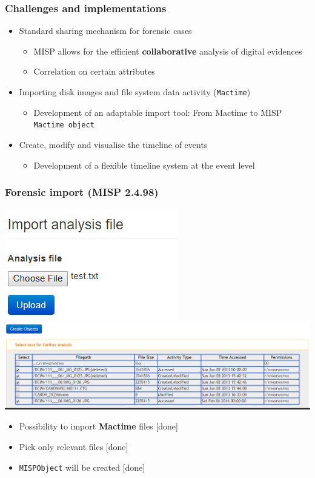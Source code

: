 \begin{frame}
\frametitle{Challenges and implementations}
    \begin{itemize}
        \item Standard sharing mechanism for forensic cases
            \begin{itemize}
                \item MISP allows for the efficient \textbf{collaborative} analysis of digital evidences
                \item Correlation on certain attributes
            \end{itemize}
        \item Importing disk images and file system data activity (\texttt{Mactime})
            \begin{itemize}
                \item Development of an adaptable import tool: From Mactime to MISP \texttt{Mactime object}
            \end{itemize}
        \item Create, modify and visualise the timeline of events
            \begin{itemize}
                \item Development of a flexible timeline system at the event level
            \end{itemize}
    \end{itemize}
\end{frame}

\begin{frame}
        \frametitle{Forensic import (MISP 2.4.98)}
    \centering
    \includegraphics[scale=0.3]{pics/import.png}
    \includegraphics[scale=0.3]{pics/import-table.png}
    \begin{itemize}
        \item Possibility to import \textbf{Mactime} files [done]
        \item Pick only relevant files [done]
        \item \texttt{MISPObject} will be created [done]
    \end{itemize}
\end{frame}

